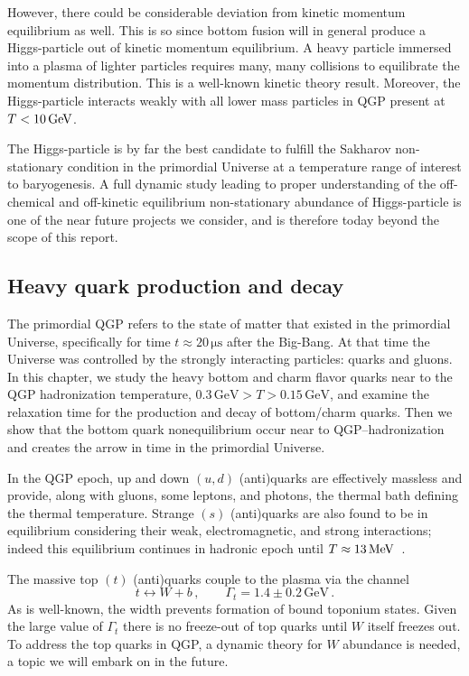 However, there could be considerable deviation from kinetic momentum equilibrium as well. This is so since bottom fusion will in general produce a Higgs-particle out of kinetic momentum equilibrium. A heavy particle immersed into a plasma of lighter particles requires many, many collisions to equilibrate the momentum distribution. This is a well-known kinetic theory result. Moreover, the Higgs-particle interacts weakly with all lower mass particles in QGP present at $T<10\text{\,GeV}$. 

The Higgs-particle is by far the best candidate to fulfill the Sakharov non-stationary condition in the primordial Universe at a temperature range of interest to baryogenesis. A full dynamic study leading to proper understanding of the off-chemical and off-kinetic equilibrium non-stationary abundance of Higgs-particle is one of the near future projects we consider, and is therefore today beyond the scope of this report. 

\subsection{Heavy quark production and decay}
\label{sec:heavyQ}
The primordial QGP refers to the state of matter that existed in the primordial Universe, specifically for time $t\approx 20\, \mathrm{\mu s}$ after the Big-Bang. At that time the Universe was controlled by the strongly interacting particles: quarks and gluons. In this chapter, we study the heavy bottom and charm flavor quarks near to the QGP hadronization temperature, $0.3\,\mathrm{GeV}>T>0.15\,\mathrm{GeV}$, and examine the relaxation time for the production and decay of bottom/charm quarks. Then we show that the bottom quark nonequilibrium occur near to QGP–hadronization and creates the arrow in time in the primordial Universe.
 
In the QGP epoch, up and down $(u,d)$ (anti)quarks are effectively massless and provide, along with gluons, some leptons, and photons, the thermal bath defining the thermal temperature. Strange $(s)$ (anti)quarks are also found to be in equilibrium considering their weak, electromagnetic, and strong interactions; indeed this equilibrium continues in hadronic epoch until $T\approx13\text{\,MeV}$~\cite{Yang:2021bko}. 

The massive top $(t)$ (anti)quarks couple to the plasma via the channel~\cite{ParticleDataGroup:2022pth} 
\begin{equation}
t\leftrightarrow W+b\,,\qquad \Gamma_t=1.4\pm0.2\,\mathrm{GeV}\,.
\end{equation}
As is well-known, the width prevents formation of bound toponium states. Given the large value of $\Gamma_t$ there is no freeze-out of top quarks until $W$ itself freezes out. To address the top quarks in QGP, a dynamic theory for $W$ abundance is needed, a topic we will embark on in the future. 
 

